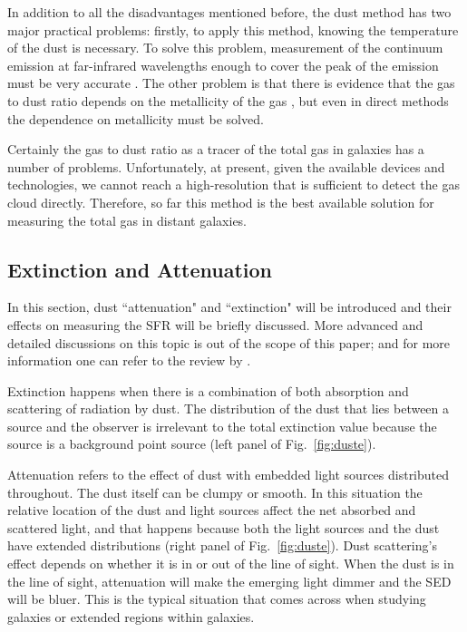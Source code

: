 In addition to all the disadvantages mentioned before, the dust method has two major practical problems: firstly, to apply this method, knowing the temperature of the dust is necessary. To solve this problem, measurement of the continuum emission at far-infrared wavelengths enough to cover the peak of the emission must be very accurate \citep{Ealas12}. The other problem is that there is evidence that the gas to dust ratio depends on the metallicity of the gas \citep{Lisenfeld98, Draine07}, but even in direct methods the dependence on metallicity must be solved. 

Certainly the gas to dust ratio as a tracer of the total gas in galaxies has a number of problems. Unfortunately, at present, given the available devices and technologies, we cannot reach a high-resolution that is sufficient to detect the gas cloud directly. Therefore, so far this method is the best available solution for measuring the total gas in distant galaxies. 



\subsection{Extinction and Attenuation}
\label{sec: ism}
In this section, dust ``attenuation" and ``extinction" will be introduced and their effects on measuring the SFR will be briefly discussed. More advanced and detailed discussions on this topic is out of the scope of this paper; and for more information one can refer to the review by \citep{Calzetti01}. 

Extinction happens when there is a combination of both absorption and scattering of radiation by dust. The distribution of the dust that lies between a source and the observer is irrelevant to the total extinction value because the source is a background point source (left panel of Fig.{~\ref{fig:duste}}).

Attenuation refers to the effect of dust with embedded light sources distributed throughout. The dust itself can be clumpy or smooth\citep{Calzetti13}. In this situation the relative location of the dust and light sources affect the net absorbed and scattered light, and that happens because both the light sources and the dust have extended distributions (right panel of Fig.{~\ref{fig:duste}}). Dust scattering's effect depends on whether it is in or out of the line of sight. When the dust is in the line of sight, attenuation will make the emerging light dimmer and the SED will be bluer. This is the typical situation that comes across when studying galaxies or extended regions within galaxies.

